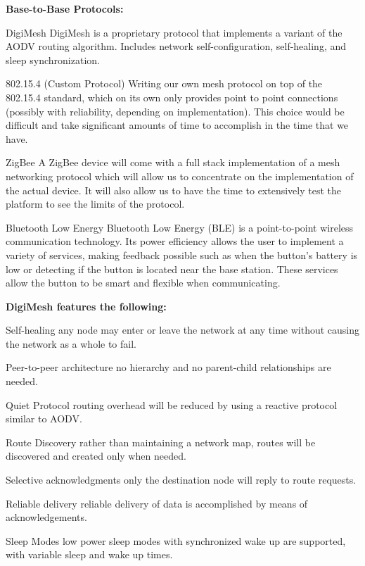 \documentclass[journal,compsoc]{IEEEtran}
\begin{document}
\textbf {Base-to-Base Protocols:}

\begin{LaTeXdescription}
  \item [DigiMesh] DigiMesh is a proprietary protocol that implements a variant of the AODV routing algorithm. Includes network self-configuration, self-healing, and sleep synchronization.
  \item [802.15.4  (Custom Protocol)] Writing our own mesh protocol on top of the 802.15.4 standard, which on its own only provides point to point connections (possibly with reliability, depending on implementation). This choice would be difficult and take significant amounts of time to accomplish in the time that we have.
  \item [ZigBee] A ZigBee device will come with a full stack implementation of a mesh networking protocol which will allow us to concentrate on the implementation of the actual device. It will also allow us to have the time to extensively test the platform to see the limits of the protocol.
  \item [Bluetooth Low Energy] Bluetooth Low Energy (BLE) is a point-to-point wireless communication technology.  Its power efficiency allows the user to implement a variety of services, making feedback possible such as when the button’s battery is low or detecting if the button is located near the base station.  These services allow the button to be smart and flexible when communicating.
\end{LaTeXdescription}

\textbf {DigiMesh features the following:}

\begin{LaTeXdescription}
  \item[Self-healing] any node may enter or leave the network at any time without causing the network as a whole to fail.
  \item[Peer-to-peer architecture] no hierarchy and no parent-child relationships are needed.
  \item[Quiet Protocol] routing overhead will be reduced by using a reactive protocol similar to AODV.
  \item[Route Discovery] rather than maintaining a network map, routes will be discovered and created only when needed.
  \item[Selective acknowledgments] only the destination node will reply to route requests.
  \item[Reliable delivery] reliable delivery of data is accomplished by means of acknowledgements.
  \item[Sleep Modes] low power sleep modes with synchronized wake up are supported, with variable sleep and wake up times.
\end{LaTeXdescription}
\end{document}
